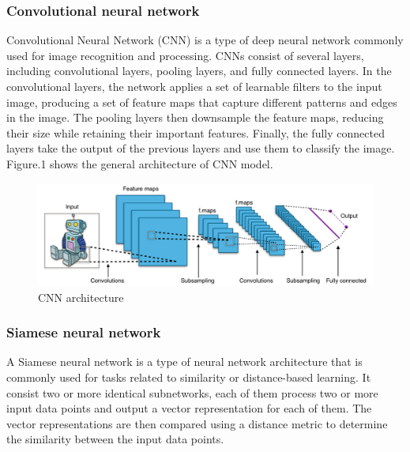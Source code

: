 \documentclass{article}
\begin{document}
\subsubsection{Convolutional neural network}
Convolutional Neural Network (CNN) is a type of deep neural network commonly used for image recognition and processing. 
CNNs consist of several layers, including convolutional layers, pooling layers, and fully connected layers. In the convolutional layers, the network applies a set of learnable filters to the input image, 
producing a set of feature maps that capture different patterns and edges in the image. The pooling layers then downsample the feature maps, reducing their size while retaining their important features. Finally, 
the fully connected layers take the output of the previous layers and use them to classify the image. Figure.1 shows the general architecture of CNN model.
\begin{figure}
    \includegraphics[width=\textwidth]{fig/CNN.png}    
    \caption{CNN architecture}
\end{figure}
\subsubsection{Siamese neural network}
A Siamese neural network is a type of neural network architecture that is commonly used for tasks related to similarity or distance-based learning.
It consist two or more identical subnetworks, each of them process two or more input data points and output a vector representation for each of them. 
The vector representations are then compared using a distance metric to determine the similarity between the input data points.
\end{document}
